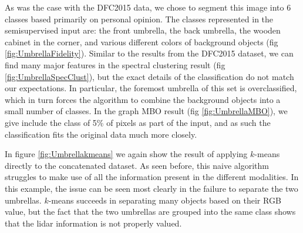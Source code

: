 \documentclass[journal]{IEEEtran}
\begin{document}
As was the case with the DFC2015 data, we chose to segment this image into 6 classes
based primarily on personal opinion. The classes represented in the
semisupervised input are: the front umbrella, the back umbrella, the wooden
cabinet in the corner, and various different colors of background objects (fig
\ref{fig:UmbrellaFidelity}). Similar to the results from the DFC2015 dataset, we can
find many major features in the spectral clustering result (fig
\ref{fig:UmbrellaSpecClust}), but the exact details of the classification do not
match our expectations. In particular, the foremost umbrella of this set is
overclassified, which in turn forces the algorithm to combine the background
objects into a small number of classes. In the graph MBO result (fig
\ref{fig:UmbrellaMBO}), we give include the class of 5\% of pixels as part of
the input, and as such the classification fits the original data much more
closely.

In figure \ref{fig:Umbrellakmeans} we again show the result of applying
$k$-means directly to the concatenated dataset. As seen before, this naive
algorithm struggles to make use of all the information present in the different
modalities. In this example, the issue can be seen most clearly in the failure
to separate the two umbrellas. $k$-means succeeds in separating many objects
based on their RGB value, but the fact that the two umbrellas are grouped into
the same class shows that the lidar information is not properly valued.

\end{document}
